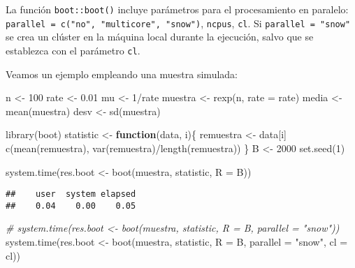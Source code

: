 \documentclass[
]{book}
\newenvironment{Shaded}{\begin{snugshade}}{\end{snugshade}}
\newcommand{\AttributeTok}[1]{\textcolor[rgb]{0.77,0.63,0.00}{#1}}
\newcommand{\CommentTok}[1]{\textcolor[rgb]{0.56,0.35,0.01}{\textit{#1}}}
\newcommand{\ControlFlowTok}[1]{\textcolor[rgb]{0.13,0.29,0.53}{\textbf{#1}}}
\newcommand{\DecValTok}[1]{\textcolor[rgb]{0.00,0.00,0.81}{#1}}
\newcommand{\FloatTok}[1]{\textcolor[rgb]{0.00,0.00,0.81}{#1}}
\newcommand{\FunctionTok}[1]{\textcolor[rgb]{0.00,0.00,0.00}{#1}}
\newcommand{\NormalTok}[1]{#1}
\newcommand{\OtherTok}[1]{\textcolor[rgb]{0.56,0.35,0.01}{#1}}
\newcommand{\SpecialCharTok}[1]{\textcolor[rgb]{0.00,0.00,0.00}{#1}}
\newcommand{\StringTok}[1]{\textcolor[rgb]{0.31,0.60,0.02}{#1}}
\theoremstyle{break}
\theoremstyle{definition}
\theoremstyle{definition}
\theoremstyle{definition}
\theoremstyle{definition}
\theoremstyle{remark}
\begin{document}
La función \texttt{boot::boot()} incluye parámetros para el procesamiento en paralelo:
\texttt{parallel\ =\ c("no",\ "multicore",\ "snow")}, \texttt{ncpus}, \texttt{cl}.
Si \texttt{parallel\ =\ "snow"} se crea un clúster en la máquina local durante la ejecución,
salvo que se establezca con el parámetro \texttt{cl}.

Veamos un ejemplo empleando una muestra simulada:

\begin{Shaded}
\begin{Highlighting}[]
\NormalTok{n }\OtherTok{\textless{}{-}} \DecValTok{100}
\NormalTok{rate }\OtherTok{\textless{}{-}} \FloatTok{0.01}
\NormalTok{mu }\OtherTok{\textless{}{-}} \DecValTok{1}\SpecialCharTok{/}\NormalTok{rate}
\NormalTok{muestra }\OtherTok{\textless{}{-}} \FunctionTok{rexp}\NormalTok{(n, }\AttributeTok{rate =}\NormalTok{ rate)}
\NormalTok{media }\OtherTok{\textless{}{-}} \FunctionTok{mean}\NormalTok{(muestra)}
\NormalTok{desv }\OtherTok{\textless{}{-}} \FunctionTok{sd}\NormalTok{(muestra)}

\FunctionTok{library}\NormalTok{(boot)}
\NormalTok{statistic }\OtherTok{\textless{}{-}} \ControlFlowTok{function}\NormalTok{(data, i)\{}
\NormalTok{  remuestra }\OtherTok{\textless{}{-}}\NormalTok{ data[i]}
  \FunctionTok{c}\NormalTok{(}\FunctionTok{mean}\NormalTok{(remuestra), }\FunctionTok{var}\NormalTok{(remuestra)}\SpecialCharTok{/}\FunctionTok{length}\NormalTok{(remuestra))}
\NormalTok{\}}
\NormalTok{B }\OtherTok{\textless{}{-}} \DecValTok{2000}
\FunctionTok{set.seed}\NormalTok{(}\DecValTok{1}\NormalTok{)}

\FunctionTok{system.time}\NormalTok{(res.boot }\OtherTok{\textless{}{-}} \FunctionTok{boot}\NormalTok{(muestra, statistic, }\AttributeTok{R =}\NormalTok{ B))}
\end{Highlighting}
\end{Shaded}

\begin{verbatim}
##    user  system elapsed 
##    0.04    0.00    0.05
\end{verbatim}

\begin{Shaded}
\begin{Highlighting}[]
\CommentTok{\# system.time(res.boot \textless{}{-} boot(muestra, statistic, R = B, parallel = "snow"))}
\FunctionTok{system.time}\NormalTok{(res.boot }\OtherTok{\textless{}{-}} \FunctionTok{boot}\NormalTok{(muestra, statistic, }\AttributeTok{R =}\NormalTok{ B, }\AttributeTok{parallel =} \StringTok{"snow"}\NormalTok{, }\AttributeTok{cl =}\NormalTok{ cl))}
\end{Highlighting}
\end{Shaded}
\end{document}
